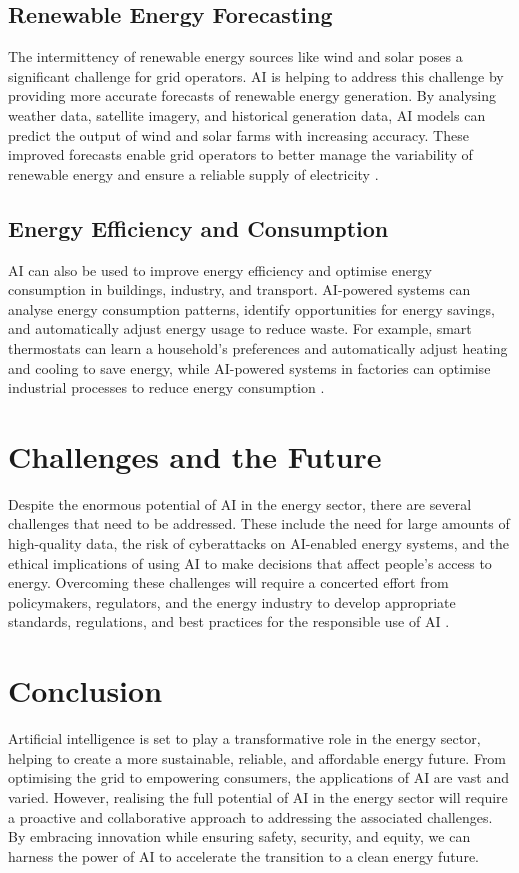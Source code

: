 \subsection{Renewable Energy Forecasting}

The intermittency of renewable energy sources like wind and solar poses a significant challenge for grid operators. AI is helping to address this challenge by providing more accurate forecasts of renewable energy generation. By analysing weather data, satellite imagery, and historical generation data, AI models can predict the output of wind and solar farms with increasing accuracy. These improved forecasts enable grid operators to better manage the variability of renewable energy and ensure a reliable supply of electricity \parencite{aliyu2022review}.

\subsection{Energy Efficiency and Consumption}

AI can also be used to improve energy efficiency and optimise energy consumption in buildings, industry, and transport. AI-powered systems can analyse energy consumption patterns, identify opportunities for energy savings, and automatically adjust energy usage to reduce waste. For example, smart thermostats can learn a household's preferences and automatically adjust heating and cooling to save energy, while AI-powered systems in factories can optimise industrial processes to reduce energy consumption \parencite{zepter2019review}.

\section{Challenges and the Future}

Despite the enormous potential of AI in the energy sector, there are several challenges that need to be addressed. These include the need for large amounts of high-quality data, the risk of cyberattacks on AI-enabled energy systems, and the ethical implications of using AI to make decisions that affect people's access to energy. Overcoming these challenges will require a concerted effort from policymakers, regulators, and the energy industry to develop appropriate standards, regulations, and best practices for the responsible use of AI \parencite{eera2025artificial}.

\section{Conclusion}

Artificial intelligence is set to play a transformative role in the energy sector, helping to create a more sustainable, reliable, and affordable energy future. From optimising the grid to empowering consumers, the applications of AI are vast and varied. However, realising the full potential of AI in the energy sector will require a proactive and collaborative approach to addressing the associated challenges. By embracing innovation while ensuring safety, security, and equity, we can harness the power of AI to accelerate the transition to a clean energy future.